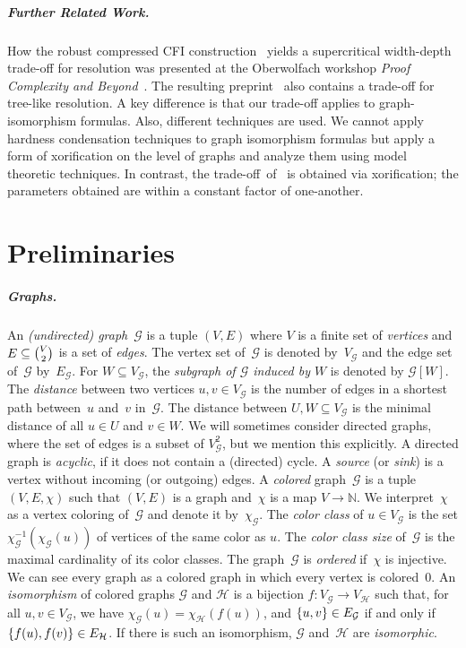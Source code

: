 \documentclass[a4paper,english, thm-restate]{lipics-v2021}
\newcommand{\defining}[1]{\emph{#1}}
\DeclarePairedDelimiter\set{\lbrace}{\rbrace}
\newcommand{\inv}[1]{#1^{-1}}
\newcommand{\nat}{\mathbb{N}}
\newcommand{\graphG}{\mathcal{G}}
\newcommand{\graphH}{\mathcal{H}}
\newcommand{\vertexG}{V_{\graphG}}
\newcommand{\vertexH}{V_{\graphH}}
\newcommand{\edgeG}{E_{\graphG}}
\newcommand{\edgeH}{E_{\graphH}}
\newcommand{\coloringG}{\chi_{\graphG}}
\newcommand{\coloringH}{\chi_{\graphH}}
\begin{document}
\subparagraph{Further Related Work.}

How the robust compressed CFI construction~\cite{RFJN024} yields  a supercritical width-depth trade-off for resolution was presented at the Oberwolfach workshop \emph{Proof Complexity and Beyond}~\cite{oberwolfach2024}.
The resulting preprint~\cite{RFJN024} also contains a trade-off for
tree-like resolution.
A key difference is that our trade-off applies to graph-isomorphism formulas. Also, different techniques are used.
We cannot apply hardness condensation techniques to graph isomorphism formulas but apply a form of xorification on the level of graphs and analyze them using model theoretic techniques. In contrast, the trade-off~of~\cite{RFJN024} is obtained via xorification; the parameters obtained are within a constant factor of one-another. 






%
%
%
%
 
                
        \section{Preliminaries}\label{sec:preliminaries}
%


\subparagraph{Graphs.}
An \defining{(undirected) graph}~$\graphG$ is a tuple $(V,E)$ where $V$ is a finite set of \defining{vertices} 
and $E \subseteq \tbinom{V}{2}$ is a set of \defining{edges}.
The vertex set of~$\graphG$ is denoted by~$\vertexG$
and the edge set of~$\graphG$ by~$\edgeG$.
For $W \subseteq \vertexG$,
the \defining{subgraph of $\graphG$ induced by $W$} is denoted by $\graphG[W]$.
The \defining{distance} between two vertices $u,v \in \vertexG$
is the number of edges in a shortest path between~$u$ and~$v$ in~$\graphG$.
The distance between $U,W \subseteq \vertexG$
is the minimal distance of
all $u \in U$ and $v \in W$.
We will sometimes consider directed graphs,
where the set of edges is a subset of $\vertexG^2$,
but we mention this explicitly.
A directed graph is \defining{acyclic}, if it does not contain a (directed) cycle.
 A \defining{source} (or \defining{sink}) is a vertex without incoming (or outgoing) edges.
%
A \defining{colored} graph~$\graphG$ is a tuple $(V,E,\chi)$
such that $(V,E)$ is a graph and~$\chi$ is a map
$V \to \nat$.
We interpret~$\chi$ as a vertex coloring of~$\graphG$ and denote it by~$\coloringG$.
The \defining{color class} of $u \in \vertexG$
is the set $\inv{\coloringG}(\coloringG(u))$ of vertices of the same color as $u$.
The \defining{color class size} of~$\graphG$
is the maximal cardinality of its color classes.
The graph~$\graphG$ is \defining{ordered} if~$\chi$ is injective.
We can see every graph as a colored graph in which every vertex is colored~$0$.
%
An \defining{isomorphism} of colored graphs $\graphG$ and $\graphH$
is a bijection $f \colon \vertexG \to \vertexH$
such that,
for all $u,v\in\vertexG$, we have $\coloringG(u) = \coloringH(f(u))$, and $\set{u,v} \in \edgeG$
if and only if $\set{f(u),f(v)} \in \edgeH$.
If there is such an isomorphism, $\graphG$ and~$\graphH$ are \defining{isomorphic}.
\end{document}

